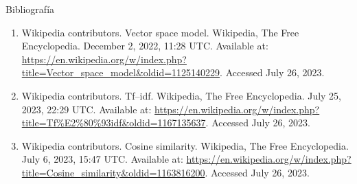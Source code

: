 \documentclass{beamer}
\begin{document}
\begin{frame}{Bibliografía }
\begin{enumerate}
\item Wikipedia contributors. Vector space model. Wikipedia, The Free Encyclopedia. December 2, 2022, 11:28 UTC. Available at: \url{https://en.wikipedia.org/w/index.php?title=Vector_space_model&oldid=1125140229}. Accessed July 26, 2023.
\item Wikipedia contributors. Tf–idf. Wikipedia, The Free Encyclopedia. July 25, 2023, 22:29 UTC. Available at: \url{https://en.wikipedia.org/w/index.php?title=Tf\%E2\%80\%93idf&oldid=1167135637}. Accessed July 26, 2023.
\item Wikipedia contributors. Cosine similarity. Wikipedia, The Free Encyclopedia. July 6, 2023, 15:47 UTC. Available at: \url{https://en.wikipedia.org/w/index.php?title=Cosine_similarity&oldid=1163816200}. Accessed July 26, 2023.
\end {enumerate}
\end{frame}
\end{document}
